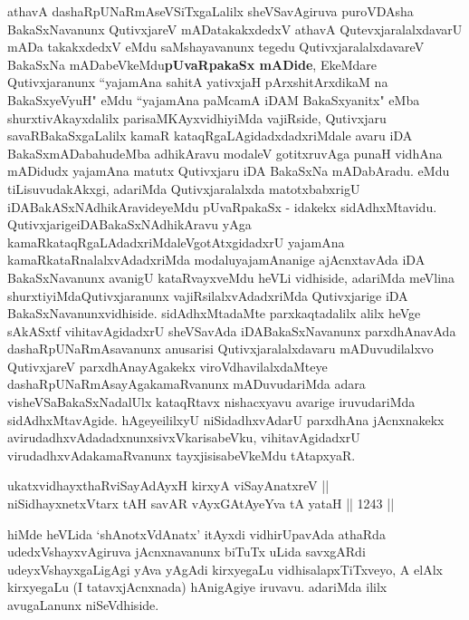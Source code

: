 \begin{artha}
	
\end{artha}


\begin{artha}
athavA dashaRpUNaRmAseVSiTxgaLalilx sheVSavAgiruva puroVDAsha BakaSxNavanunx QutivxjareV mADatakakxdedxV athavA QutevxjaralalxdavarU mADa takakxdedxV eMdu saMshayavanunx tegedu QutivxjaralalxdavareV BakaSxNa mADabeVkeMdu\textbf{pUvaRpakaSx mADide}, EkeMdare Qutivxjaranunx ``yajamAna sahitA yativxjaH pArxshitArxdikaM na BakaSxyeVyuH" eMdu ``yajamAna paMcamA iDAM BakaSxyanitx" eMba shurxtivAkayxdalilx parisaMKAyxvidhiyiMda vajiRside, Qutivxjaru savaRBakaSxgaLalilx kamaR kataqRgaLAgidadxdadxriMdale avaru iDA BakaSxmADabahudeMba adhikAravu modaleV gotitxruvAga punaH vidhAna mADidudx yajamAna matutx Qutivxjaru iDA BakaSxNa mADabAradu. eMdu tiLisuvudakAkxgi, adariMda Qutivxjaralalxda matotxbabxrigU iDABakASxNAdhikAra\-\break videyeMdu pUvaRpakaSx - idakekx sidAdhxMtavidu. Qutivxjarige\break iDABakaSxNAdhikAravu yAga kamaRkataqRgaLAdadxriMdaleV\break gotAtxgidadxrU yajamAna kamaRkataRnalalxvAdadxriMda modalu\break yajamAnanige ajAcnxtavAda iDA BakaSxNavanunx avanigU kataRvayxveMdu heVLi vidhiside, adariMda meVlina shurxtiyiMda\break Qutivxjaranunx vajiRsilalxvAdadxriMda Qutivxjarige iDA BakaSxNavanunx\break vidhiside. sidAdhxMtadaMte parxkaqtadalilx alilx heVge sAkASxtf vihitavAgidadxrU sheVSavAda iDABakaSxNavanunx parxdhAnavAda dashaRpUNaRmAsavanunx anusarisi Qutivxjaralalxdavaru mADuvudilalxvo QutivxjareV parxdhAnayAgakekx viroVdhavilalxdaMteye dashaRpUNaRmAsayAga\break kamaRvanunx mADuvudariMda adara visheVSaBakaSxNadalUlx kataqRtavx nishacxyavu avarige iruvudariMda sidAdhxMtavAgide. hAgeye\break ililxyU niSidadhxvAdarU parxdhAna jAcnxnakekx avirudadhxvAdadadxnunx\break sivxVkarisabeVku, vihitavAgidadxrU virudadhxvAdakamaRvanunx tayxjisisabeVkeMdu tAtapxyaR.
\end{artha}

\begin{shl}
ukatxvidhayxthaRviSayAdAyxH kirxyA viSayAnatxreV || \\
niSidhayxnetxV\s tarx tAH savAR vAyxGAtAyeYva tA yataH \hfill || 1243 ||  
\end{shl}

\begin{artha}
hiMde heVLida `shAnotxVdAnatx'  itAyxdi vidhirUpavAda athaRda udedxVshayxvAgiruva jAcnxnavanunx biTuTx uLida savxgARdi udeyxVshayxgaLigAgi yAva yAgAdi kirxyegaLu vidhisalapxTiTxveyo, A elAlx kirxyegaLu (I tatavxjAcnxnada) hAnigAgiye iruvavu. adariMda ililx avugaLanunx niSeVdhiside.
\end{artha}

